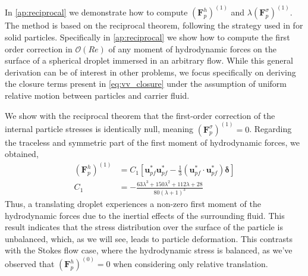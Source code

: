 In \ref{ap:reciprocal} we demonstrate how to compute $(\textbf{F}^h_p)^{(1)}$ and $\lambda (\textbf{F}^\sigma_p)^{(1)}$. 
The method is based on the reciprocal theorem, following the strategy used in \citet{stone2001inertial,masoud2019reciprocal} for solid particles. 
Specifically in \ref{ap:reciprocal} we show how to compute the first order correction in $\mathcal{O}(Re)$ of any moment of hydrodynamic forces on the surface of a spherical droplet immersed in an arbitrary flow. 
While this general derivation can be of interest in other problems, we focus specifically on deriving the closure terms present in \ref{eq:vv_closure} under the assumption of uniform relative motion between particles and carrier fluid. 


We show with the reciprocal theorem that the first-order correction of the internal particle stresses is identically null, meaning $(\textbf{F}^\sigma_p)^{(1)} = 0$. 
Regarding the traceless and symmetric part of the first moment of hydrodynamic forces, we obtained, 
\begin{align}
    (\textbf{F}^h_p)^{(1)}  
    &=
    C_1 
    [
        \textbf{u}_{pf}^*\textbf{u}_{pf}^* - \frac{1}{3}(\textbf{u}_{pf}^*\cdot \textbf{u}_{pf}^*)\bm\delta 
    ]\\
    C_1 &=
    - \frac{63 \lambda^{3} + 150 \lambda^{2} + 112 \lambda + 28}{80 \left(\lambda + 1\right)^{3}}
    \label{eq:closure_sigma_e}
\end{align}
Thus, a translating droplet experiences a non-zero first moment of the hydrodynamic forces due to the inertial effects of the surrounding fluid. This result indicates that the stress distribution over the surface of the particle is unbalanced, which, as we will see, leads to particle deformation.
This contrasts with the Stokes flow case, where the hydrodynamic stress is balanced, as we've observed that $(\textbf{F}^h_p)^{(0)} = 0$ when considering only relative translation.  


